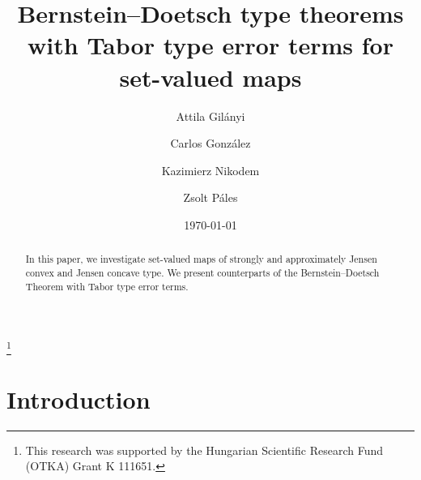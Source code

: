 \documentclass[12pt,reqno]{amsart}
\theoremstyle{definition}
\begin{document}
\begin{flushright}
\end{flushright}
\vspace{5mm}

\date{\today}

\title[Bernstein--Doetsch type theorems with Tabor type error terms]
{Bernstein--Doetsch type theorems \\ with Tabor type error terms for set-valued maps}

\author[A. Gil\'anyi]{Attila Gil\'anyi}
\address{Faculty of Informatics, University of Debrecen, H-4032 Debrecen, Egyetem t\'er 1, Hungary}

\author[C. Gonz\'alez]{Carlos Gonz\'alez}
\address{Escuela de Matematicas, Universidad Central de Venezuela, Caracas, Venezuela}

\author[K. Nikodem]{Kazimierz Nikodem}
\address{Department of Mathematics, University of Bielsko-Biala, 
ul.\ Willowa~2, 43-309 Bielsko-Bia{\l}a, Poland}

\author[Zs. P\'ales]{Zsolt P\'ales}
\address{Institute of Mathematics, University of Debrecen, H-4032 Debrecen, Egyetem t\'er 1, Hungary}



\thanks{This research was supported by the Hungarian Scientific Research Fund (OTKA) Grant K 111651.}

\begin{abstract}
In this paper, we investigate set-valued maps of strongly and approximately Jensen convex and Jensen 
concave type. We present counterparts of the Bernstein--Doetsch Theorem with Tabor type error terms.
\end{abstract}

\maketitle


\section{Introduction}
\end{document}
